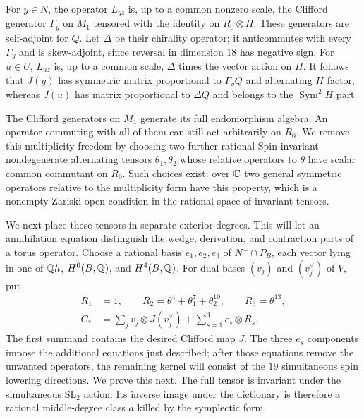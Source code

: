 For $y\in N$, the operator $L_{yz}$ is, up to a common nonzero
scale, the Clifford generator $\Gamma_y$ on $M_1$ tensored with
the identity on $R_0\otimes H$.  These generators are
self-adjoint for $Q$.  Let $\Delta$ be their chirality operator;
it anticommutes with every $\Gamma_y$ and is skew-adjoint,
since reversal in dimension $18$ has negative sign.  For
$u\in U$, $L_{uz}$ is, up to a common scale, $\Delta$ times
the vector action on $H$.  It follows that $J(y)$ has symmetric
matrix proportional to $\Gamma_yQ$ and alternating $H$ factor,
whereas $J(u)$ has matrix proportional to $\Delta Q$ and
belongs to the $\operatorname{Sym}^2H$ part.

The Clifford generators on $M_1$ generate its full endomorphism
algebra.  An operator commuting with all of them can still act
arbitrarily on $R_0$.  We remove this multiplicity freedom by choosing
two further rational Spin-invariant nondegenerate
alternating tensors $\theta_1,\theta_2$ whose relative
operators to $\theta$ have scalar common commutant on $R_0$.
Such choices exist: over $\mathbb C$ two general symmetric operators
relative to the multiplicity form have this property, which is
a nonempty Zariski-open condition in the rational space of
invariant tensors.

We next place these tensors in separate exterior degrees.  This will
let an annihilation equation distinguish the wedge, derivation, and
contraction parts of a torus operator.  Choose a rational basis
$e_1,e_2,e_3$ of $N^\perp\cap P_B$,
each vector lying in one of $\mathbb Q h$, $H^0(B,\mathbb Q)$, and
$H^4(B,\mathbb Q)$.  For dual bases $(v_j)$ and $(v_j^\vee)$ of
$V$, put
\begin{equation}
 \label{ks:test-tensor}
 \begin{split}
 R_1&=1,\qquad
 R_2=\theta^4+\theta_1^7+\theta_2^{10},\qquad
 R_3=\theta^{13},\\
 C_*&=\sum_jv_j\otimes J(v_j^\vee)
            +\sum_{s=1}^3e_s\otimes R_s.
 \end{split}
\end{equation}
The first summand contains the desired Clifford map $J$.
The three $e_s$ components impose the additional equations just
described; after those equations remove the unwanted operators,
the remaining kernel will consist of the $19$ simultaneous spin
lowering directions.  We prove this next.
The full tensor is invariant under the simultaneous $\mathrm{SL}_2$
action.  Its inverse image under the dictionary is therefore
a rational middle-degree class $a$ killed by the symplectic
form.

